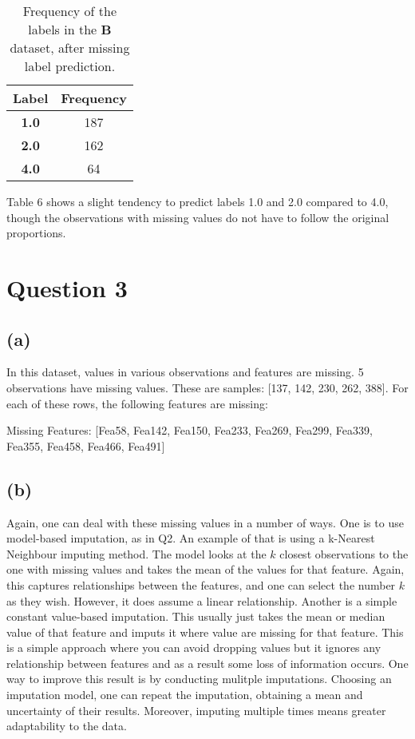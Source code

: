 \documentclass[12pt]{report} %
\begin{document}
\begin{table}[h]
    \centering
    \begin{tabular}{ |c|c| }
        \hline
        \textbf{Label} & \textbf{Frequency} \\
        \hline
        \textbf{1.0} & 187 \\ 
        \hline
        \textbf{2.0} & 162 \\
        \hline
        \textbf{4.0} & 64 \\
        \hline
    \end{tabular}
    \caption{Frequency of the labels in the \textbf{B} dataset, after missing label prediction.}
    \end{table}

Table 6 shows a slight tendency to predict labels 1.0 and 2.0 compared to 4.0, though the observations with missing values do not have to follow the original proportions.

\section*{Question 3}

\subsection*{(a)}

In this dataset, values in various observations and features are missing. 5 observations have missing values. These are samples: [137, 142, 230, 262, 388]. For each of these rows, the following features are missing:

\begin{center}
    Missing Features: [Fea58, Fea142, Fea150, Fea233, Fea269, Fea299, Fea339, Fea355, Fea458, Fea466, Fea491]
\end{center}

\subsection*{(b)}

Again, one can deal with these missing values in a number of ways.  
One is to use model-based imputation, as in Q2. An example of that is using a k-Nearest Neighbour imputing method. The model looks at the $k$ closest observations to the one with missing values and takes the mean of the values for that feature. Again, this captures relationships between the features, and one can select the number $k$ as they wish. However, it does assume a linear relationship.  
Another is a simple constant value-based imputation. This usually just takes the mean or median value of that feature and imputs it where value are missing for that feature. This is a simple approach where you can avoid dropping values but it ignores any relationship between features and as a result some loss of information occurs.  
One way to improve this result is by conducting mulitple imputations. Choosing an imputation model, one can repeat the imputation, obtaining a mean and uncertainty of their results. Moreover, imputing multiple times means greater adaptability to the data\cite{reiter2020}.
\end{document}
